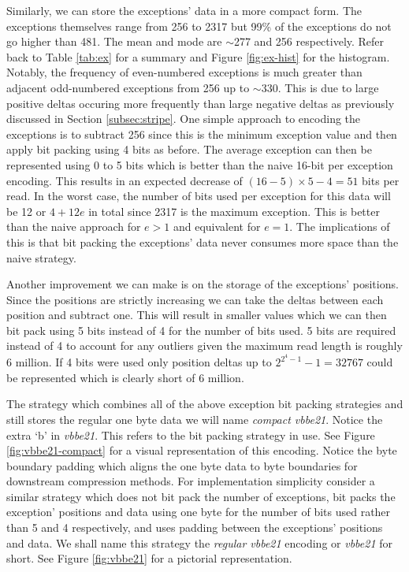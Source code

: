Similarly, we can store the exceptions' data in a more compact form.
The exceptions themselves range from 256 to 2317 but 99\%
of the exceptions do not go higher than 481. The mean and mode are $\sim$277 and
256 respectively. Refer back to Table \ref{tab:ex} for a summary and Figure
\ref{fig:ex-hist} for the histogram. Notably, the frequency of even-numbered
exceptions is much greater than adjacent odd-numbered exceptions from 256 up to
$\sim$330. This is due to large positive deltas occuring more frequently than
large negative deltas as previously discussed in Section \ref{subsec:stripe}.
One simple approach to encoding the exceptions is to subtract 256 since this is
the minimum exception value and then apply bit packing using 4 bits as before. The
average exception can then be represented using
0 to 5 bits which is better than the naive 16-bit per exception encoding. This
results in an expected decrease of $(16-5)\times 5-4=51$ bits per read.
In the worst case, the number of bits used per exception for this data will be 12
or $4 + 12e$ in total since 2317 is the maximum exception. This is better than
the naive approach for $e>1$ and equivalent for $e=1$. The implications of this
is that bit packing the exceptions' data never consumes more space than the
naive strategy.



Another improvement we can make is on the storage of the exceptions' positions.
Since the positions are strictly increasing we can take the deltas between each
position and subtract one. This will result in smaller values which we can then
bit pack using 5 bits instead of 4 for the number of bits used.
5 bits are required instead of 4 to account for any outliers given the maximum
read length is roughly 6 million. If 4 bits were used only position deltas up to
$2^{2^{4}-1}-1=32767$ could be represented which is clearly short of 6 million.

The strategy which combines all of the above exception bit packing strategies
and still stores the regular one byte data we will name \textit{compact vbbe21}.
Notice the extra `b' in \textit{vbbe21}. This refers to the bit packing
strategy in use.
See Figure \ref{fig:vbbe21-compact} for a visual representation of this
encoding. Notice the byte boundary padding which aligns the one byte data to
byte boundaries for downstream compression methods. For implementation
simplicity consider a similar strategy which does not bit pack the number of
exceptions, bit packs the exception' positions and data using one byte for the
number of bits used rather than 5 and 4 respectively, and uses padding between
the exceptions' positions and data. We shall name this strategy the
\textit{regular vbbe21} encoding or \textit{vbbe21} for short. See Figure
\ref{fig:vbbe21} for a pictorial representation.

